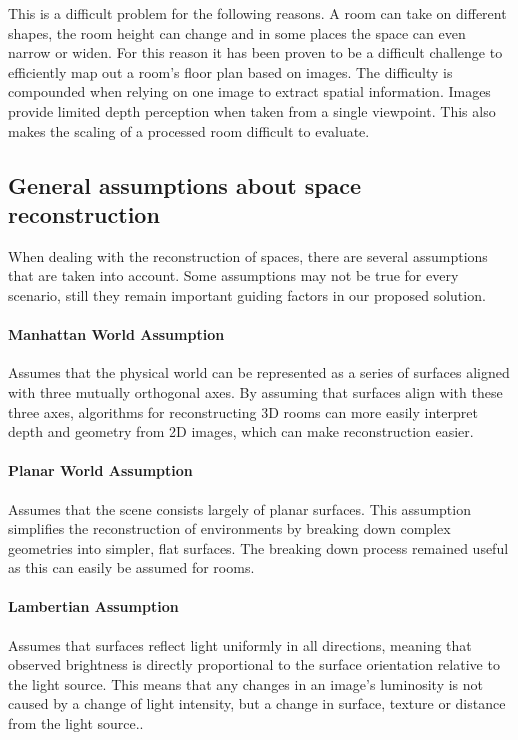 This is a difficult problem for the following reasons. A room can take on different shapes, the room height can change and in some places the space can even narrow or widen. For this reason it has been proven to be a difficult challenge to efficiently map out a room's floor plan based on images. The difficulty is compounded when relying on one image to extract spatial information. Images provide limited depth perception when taken from a single viewpoint. This also makes the scaling of a processed room difficult to evaluate.

\subsection{General assumptions about space reconstruction}
When dealing with the reconstruction of spaces, there are several assumptions that are taken into account. Some assumptions may not be true for every scenario, still they remain important guiding factors in our proposed solution.

\paragraph{Manhattan World Assumption\cite{coughlan2000manhattan}} Assumes that the physical world can be represented as a series of surfaces aligned with three mutually orthogonal axes. By assuming that surfaces align with these three axes, algorithms for reconstructing 3D rooms can more easily interpret depth and geometry from 2D images, which can make reconstruction easier.

\paragraph{Planar World Assumption\cite{barrera2013multispectral}} Assumes that the scene consists largely of planar surfaces. This assumption simplifies the reconstruction of environments by breaking down complex geometries into simpler, flat surfaces. The breaking down process remained useful as this can easily be assumed for rooms. 

\paragraph{Lambertian Assumption\cite{smith1980lambertian}} Assumes that surfaces reflect light uniformly in all directions, meaning that observed brightness is directly proportional to the surface orientation relative to the light source. This means that any changes in an image's luminosity is not caused by a change of light intensity, but a change in surface, texture or distance from the light source..

